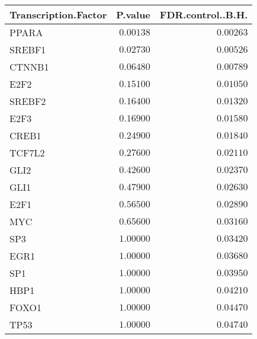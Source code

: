 \begin{table}[!tbp]
\begin{center}
\begin{tabular}{lrr}
\toprule
\multicolumn{1}{c}{Transcription.Factor}&\multicolumn{1}{c}{P.value}&\multicolumn{1}{c}{FDR.control..B.H.}\tabularnewline
\midrule
PPARA&$0.00138$&$0.00263$\tabularnewline
SREBF1&$0.02730$&$0.00526$\tabularnewline
CTNNB1&$0.06480$&$0.00789$\tabularnewline
E2F2&$0.15100$&$0.01050$\tabularnewline
SREBF2&$0.16400$&$0.01320$\tabularnewline
E2F3&$0.16900$&$0.01580$\tabularnewline
CREB1&$0.24900$&$0.01840$\tabularnewline
TCF7L2&$0.27600$&$0.02110$\tabularnewline
GLI2&$0.42600$&$0.02370$\tabularnewline
GLI1&$0.47900$&$0.02630$\tabularnewline
E2F1&$0.56500$&$0.02890$\tabularnewline
MYC&$0.65600$&$0.03160$\tabularnewline
SP3&$1.00000$&$0.03420$\tabularnewline
EGR1&$1.00000$&$0.03680$\tabularnewline
SP1&$1.00000$&$0.03950$\tabularnewline
HBP1&$1.00000$&$0.04210$\tabularnewline
FOXO1&$1.00000$&$0.04470$\tabularnewline
TP53&$1.00000$&$0.04740$\tabularnewline
\bottomrule
\end{tabular}\end{center}

\end{table}
